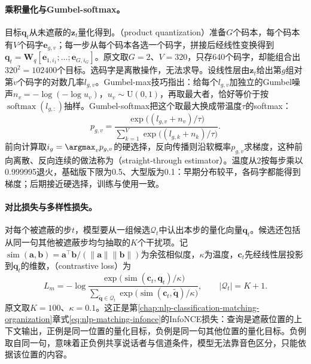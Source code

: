 \paragraph{乘积量化与Gumbel-softmax。}目标$\bm q_t$从未遮蔽的$\bm z_t$量化得到。（product quantization）准备$G$个码本，每个码本有$V$个码字$\bm e_{g,v}$；每一步从每个码本各选一个码字，拼接后经线性变换得到$\bm q_t=\bm W_q[\bm e_{1,i_1};\ldots;\bm e_{G,i_G}]$。原文取$G=2$、$V=320$，只存640个码字，却能组合出$320^2=102400$个目标。选码字是离散操作，无法求导。设线性层由$\bm z_t$给出第$g$组对第$v$个码字的对数几率$l_{g,v}$。Gumbel-max技巧指出：给每个$l_{g,v}$加独立的Gumbel噪声$n_v=-\log(-\log u_v)$，$u_v\sim\mathrm U(0,1)$，再取最大者，恰好等价于按$\operatorname{softmax}(l_{g,:})$抽样。Gumbel-softmax把这个取最大换成带温度$\tau$的softmax\cite{nlp-speech-jang2017gumbel}：
\begin{equation}
 p_{g,v}=\frac{\exp\bigl((l_{g,v}+n_v)/\tau\bigr)}{\sum_{k=1}^{V}\exp\bigl((l_{g,k}+n_k)/\tau\bigr)}.
 \label{eq:nlp-speech-gumbel}
\end{equation}
前向计算取$i_g=\argmax_v p_{g,v}$的硬选择，反向传播则沿软概率$p_{g,v}$求梯度，这种前向离散、反向连续的做法称为（straight-through estimator）。温度从2按每步乘以0.999995退火，基础版下限为0.5、大型版为0.1：早期分布较平，各码字都能得到梯度；后期接近硬选择，训练与使用一致。

\paragraph{对比损失与多样性损失。}对每个被遮蔽的步$t$，模型要从一组候选$\mathcal Q_t$中认出本步的量化向量$\bm q_t$。候选还包括从同一句其他被遮蔽步均匀抽取的$K$个干扰项。记$\operatorname{sim}(\bm a,\bm b)=\bm a^{\top}\bm b/(\lVert\bm a\rVert\lVert\bm b\rVert)$为余弦相似度，$\kappa$为温度，$\bm c_t$先经线性层投影到$\bm q_t$的维数，（contrastive loss）为
\begin{equation}
 L_m=-\log\frac{\exp\bigl(\operatorname{sim}(\bm c_t,\bm q_t)/\kappa\bigr)}
 {\sum_{\tilde{\bm q}\in\mathcal Q_t}\exp\bigl(\operatorname{sim}(\bm c_t,\tilde{\bm q})/\kappa\bigr)},
 \qquad |\mathcal Q_t|=K+1.
 \label{eq:nlp-speech-wav2vec}
\end{equation}
原文取$K=100$、$\kappa=0.1$。这正是第\ref{chap:nlp-classification-matching-organization}章式\eqref{eq:nlp-matching-infonce}的InfoNCE损失：查询是遮蔽位置的上下文输出，正例是同一位置的量化目标，负例是同一句其他位置的量化目标。负例取自同一句，意味着正负例共享说话者与信道条件，模型无法靠音色区分，只能依据该位置的内容。

